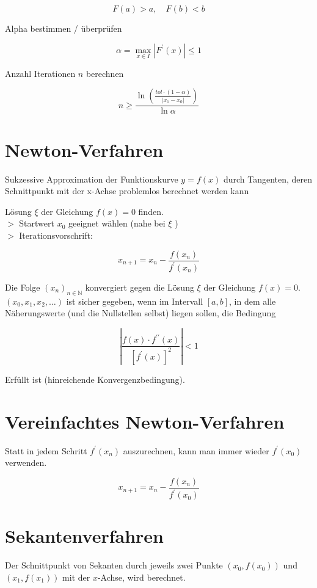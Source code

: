 \documentclass[10pt]{article}
\begin{document}
$$
F(a)>a, \quad F(b)<b
$$

Alpha bestimmen / überprüfen

$$
\alpha=\max _{x \in I}\left|F^{\prime}(x)\right| \leq 1
$$

Anzahl Iterationen $n$ berechnen

$$
n \geq \frac{\ln \left(\frac{t o l \cdot(1-\alpha)}{\left|x_{1}-x_{0}\right|}\right)}{\ln \alpha}
$$

\section*{Newton-Verfahren}
Sukzessive Approximation der Funktionskurve $y=f(x)$ durch Tangenten, deren Schnittpunkt mit der x-Achse problemlos berechnet werden kann

Lösung $\xi$ der Gleichung $f(x)=0$ finden.\\
$>$ Startwert $x_{0}$ geeignet wählen (nahe bei $\xi$ )\\
$>$ Iterationsvorschrift:

$$
x_{n+1}=x_{n}-\frac{f\left(x_{n}\right)}{f^{\prime}\left(x_{n}\right)}
$$

Die Folge $\left(x_{n}\right)_{n \in \mathbb{N}}$ konvergiert gegen die Lösung $\xi$ der Gleichung $f(x)=0$.\\
$\left(x_{0}, x_{1}, x_{2}, \ldots\right)$ ist sicher gegeben, wenn im Intervall $[a, b]$, in dem alle Näherungswerte (und die Nullstellen selbst) liegen sollen, die Bedingung

$$
\left|\frac{f(x) \cdot f^{\prime \prime}(x)}{\left[f^{\prime}(x)\right]^{2}}\right|<1
$$

Erfüllt ist (hinreichende Konvergenzbedingung).

\section*{Vereinfachtes Newton-Verfahren}
Statt in jedem Schritt $f^{\prime}\left(x_{n}\right)$ auszurechnen, kann man immer wieder $f^{\prime}\left(x_{0}\right)$ verwenden.

$$
x_{n+1}=x_{n}-\frac{f\left(x_{n}\right)}{f^{\prime}\left(x_{0}\right)}
$$

\section*{Sekantenverfahren}
Der Schnittpunkt von Sekanten durch jeweils zwei Punkte $\left(x_{0}, f\left(x_{0}\right)\right)$ und $\left(x_{1}, f\left(x_{1}\right)\right)$ mit der $x$-Achse, wird berechnet.
\end{document}
